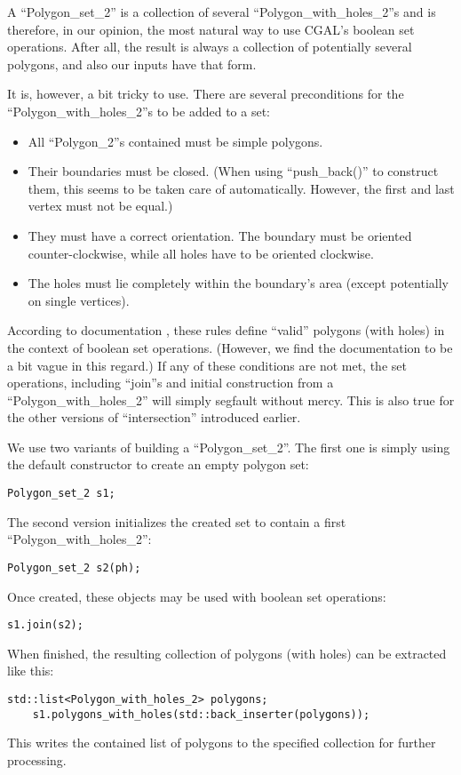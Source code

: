 A ``Polygon\_set\_2'' is a collection of several ``Polygon\_with\_holes\_2''s and is therefore, in our opinion,
the most natural way to use CGAL's boolean set operations. After all, the result is always a collection of potentially
several polygons, and also our inputs have that form.

It is, however, a bit tricky to use. There are several preconditions for the ``Polygon\_with\_holes\_2''s to be added
to a set:

\begin{itemize}
\item All ``Polygon\_2''s contained must be simple polygons.
\item Their boundaries must be closed. (When using ``push\_back()'' to construct them, this seems to be taken care of
  automatically. However, the first and last vertex must not be equal.)
\item They must have a correct orientation. The boundary must be oriented counter-clockwise, while all holes have to
  be oriented clockwise.
\item The holes must lie completely within the boundary's area (except potentially on single vertices).
\end{itemize}

According to documentation \cite{cgal:fwzh-rbso2-12b}, these rules define ``valid'' polygons (with holes) in the context of boolean set
operations. (However, we find the documentation to be a bit vague in this regard.)
If any of these conditions are not met, the set operations, including ``join''s and initial construction from a
``Polygon\_with\_holes\_2'' will simply segfault without mercy. This is also true for the other versions of
``intersection'' introduced earlier.

We use two variants of building a ``Polygon\_set\_2''. The first one is simply using the default constructor
to create an empty polygon set:

\begin{lstlisting}[numbers=none]
    Polygon_set_2 s1;
\end{lstlisting}

The second version initializes the created set to contain a first ``Polygon\_with\_holes\_2'':

\begin{lstlisting}[numbers=none]
    Polygon_set_2 s2(ph);
\end{lstlisting}
    
Once created, these objects may be used with boolean set operations:

\begin{lstlisting}[numbers=none]
    s1.join(s2);
\end{lstlisting}
    
When finished, the resulting collection of polygons (with holes) can be extracted like this:

\begin{lstlisting}[numbers=none]
    std::list<Polygon_with_holes_2> polygons;
    s1.polygons_with_holes(std::back_inserter(polygons));
\end{lstlisting}
    
This writes the contained list of polygons to the specified collection for further processing.
